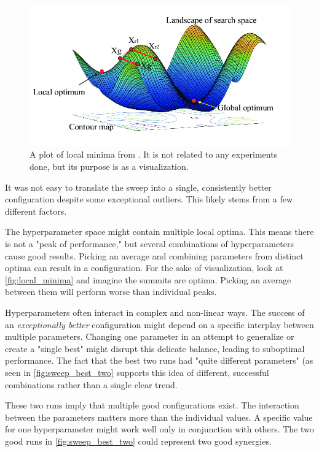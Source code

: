 \begin{figure}
    \centering
    \includegraphics[width=0.75\linewidth]{figures/local_minima.png}
    \caption{A plot of local minima from \cite{fig:multiple_local_minima}. It is not related to any experiments done, but its purpose is as a visualization.}
    \label{fig:local_minima}
\end{figure}

It was not easy to translate the sweep into a single, consistently better configuration despite some exceptional outliers. This likely stems from a few different factors. 

The hyperparameter space might contain multiple local optima. This means there is not a "peak of performance," but several combinations of hyperparameters cause good results. Picking an average and combining parameters from distinct optima can result in a configuration. For the sake of visualization, look at \autoref{fig:local_minima} and imagine the summits are optima. Picking an average between them will perform worse than individual peaks. 

Hyperparameters often interact in complex and non-linear ways. The success of an \emph{exceptionally better} configuration might depend on a specific interplay between multiple parameters. Changing one parameter in an attempt to generalize or create a "single best" might disrupt this delicate balance, leading to suboptimal performance. The fact that the best two runs had "quite different parameters" (as seen in \autoref{fig:sweep_best_two} supports this idea of different, successful combinations rather than a single clear trend.


These two runs imply that multiple good configurations exist. The interaction between the parameters matters more than the individual values. A specific value for one hyperparameter might work well only in conjunction with others. The two good runs in \autoref{fig:sweep_best_two} could represent two good synergies. 



